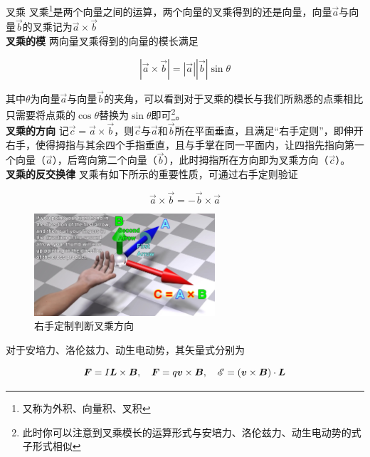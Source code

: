 \begin{defi}[label=d_cc]{叉乘}{}
叉乘\footnote{又称为外积、向量积、叉积}是两个向量之间的运算，两个向量的叉乘得到的还是向量，向量$\vec{a}$与向量$\vec{b}$的叉乘记为$\vec{a} \times \vec{b}$
~\\

\textbf{叉乘的模}  \quad 两向量叉乘得到的向量的模长满足

$$ | \vec{a} \times \vec{b} | = | \vec{a} | | \vec{b} | \sin \theta$$

其中$\theta$为向量$\vec{a}$与向量$\vec{b}$的夹角，可以看到对于叉乘的模长与我们所熟悉的点乘相比只需要将点乘的$\cos \theta$替换为$\sin \theta$即可\footnote{此时你可以注意到叉乘模长的运算形式与安培力、洛伦兹力、动生电动势的式子形式相似}。
~\\

\textbf{叉乘的方向} \quad 记$\vec{c} = \vec{a} \times \vec{b}$，则$\vec{c}$与$\vec{a}$和$\vec{b}$所在平面垂直，且满足“右手定则”，即伸开右手，使得拇指与其余四个手指垂直，且与手掌在同一平面内，让四指先指向第一个向量（$\vec{a}$），后弯向第二个向量（$\vec{b}$），此时拇指所在方向即为叉乘方向（$\vec{c}$）。
~\\

\textbf{叉乘的反交换律} \quad 叉乘有如下所示的重要性质，可通过右手定则验证

$$\vec{a} \times \vec{b} = - \vec{b} \times \vec{a}$$

\end{defi}

\begin{figure}[htbp]
\centering
{}
\includegraphics[width=0.6\textwidth]{pic_eled/xxsyt.jpg}
\caption{右手定制判断叉乘方向\protect \footnotemark[\value{footnote}]}
\end{figure}


对于安培力、洛伦兹力、动生电动势，其矢量式分别为

$$\boldsymbol{F} = I \boldsymbol{L} \times \boldsymbol{B}, \quad \boldsymbol{F} = q \boldsymbol{v} \times \boldsymbol{B}, \quad \mathscr{E} = (\boldsymbol{v} \times \boldsymbol{B}) \cdot \boldsymbol{L}$$

